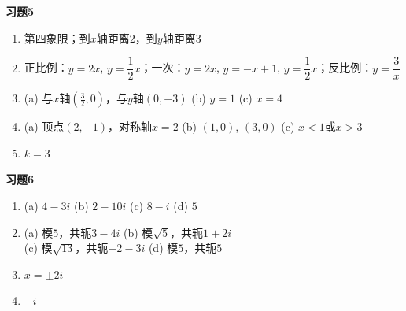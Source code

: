 \documentclass[a4paper,12pt]{ctexart}
\begin{document}
\textbf{习题5}
\begin{enumerate}
\item[(1)] 第四象限；到$x$轴距离$2$，到$y$轴距离$3$
\item[(2)] 正比例：$y=2x$, $y=\dfrac12x$；一次：$y=2x$, $y=-x+1$, $y=\dfrac12x$；反比例：$y=\dfrac3x$
\item[(3)] (a) 与$x$轴$(\frac32,0)$，与$y$轴$(0,-3)$ \qquad (b) $y=1$ \qquad (c) $x=4$
\item[(4)] (a) 顶点$(2,-1)$，对称轴$x=2$ \qquad (b) $(1,0)$, $(3,0)$ \qquad (c) $x<1$或$x>3$
\item[(5)] $k=3$
\end{enumerate}

\textbf{习题6}
\begin{enumerate}
\item[(1)] (a) $4-3i$ \qquad (b) $2-10i$ \qquad (c) $8-i$ \qquad (d) $5$
\item[(2)] (a) 模$5$，共轭$3-4i$ \qquad (b) 模$\sqrt5$，共轭$1+2i$ \\ \qquad (c) 模$\sqrt{13}$，共轭$-2-3i$ \qquad (d) 模$5$，共轭$5$
\item[(3)] $x=\pm2i$
\item[(4)] $-i$
\end{enumerate}
\end{document}
